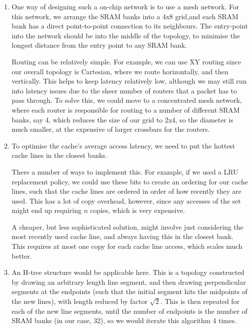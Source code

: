 \documentclass[12pt]{article}
\begin{document}
\begin{enumerate}[label=(\alph*)]
    \item
        One way of designing such a on-chip network is to use a mesh network. For this network, we arrange the SRAM banks into a 4x8 grid,and each SRAM bank has a direct point-to-point connection to its neighbours. The entry-point into the network should be into the middle of the topology, to minimise the longest distance from the entry point to any SRAM bank.

        Routing can be relatively simple. For example, we can use XY routing since our overall topology is Cartesian, where we route horizontally, and then vertically. This helps to keep latency relatively low, although we may still run into latency issues due to the sheer number of routers that a packet has to pass through. To solve this, we could move to a concentrated mesh network, where each router is responsible for routing to a number of different SRAM banks, say 4, which reduces the size of our grid to 2x4, so the diameter is much smaller, at the expensive of larger crossbars for the routers.

    \item
        To optimise the cache's average access latency, we need to put the hottest cache lines in the closest banks.

        There a number of ways to implement this. For example, if we used a LRU replacement policy, we could use these bits to create an ordering for our cache lines, such that the cache lines are ordered in order of how recently they are used. This has a lot of copy overhead, however, since any accesses of the set might end up requiring $n$ copies, which is very expensive.

        A cheaper, but less sophisticated solution, might involve just considering the most recently used cache line, and always having this in the closest bank. This requires at most one copy for each cache line access, which scales much better.

    \item
        An H-tree structure would be applicable here. This is a topology constructed by drawing an arbitrary length line segment, and then drawing perpendicular segments at the endpoints (such that the initial segment hits the midpoints of the new lines), with length reduced by factor $\sqrt{2}$. This is then repeated for each of the new line segments, until the number of endpoints is the number of SRAM banks (in our case, 32), so we would iterate this algorithm 4 times.


\end{enumerate}
\end{document}
